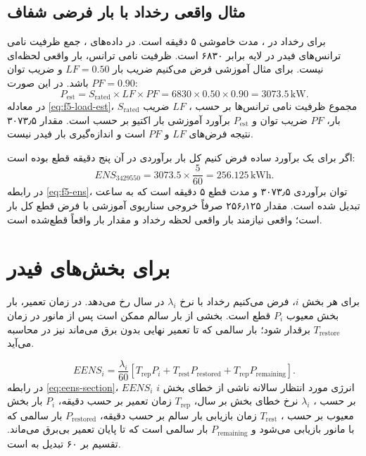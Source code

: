 \documentclass[11pt,a4paper,oneside]{book}
\newcommand{\file}[1]{\lr{\texttt{#1}}}
\newcommand{\code}[1]{\lr{\texttt{#1}}}
\newcommand{\unit}[1]{\,\mathrm{#1}}
\begin{document}
\subsection{مثال واقعی رخداد با بار فرضی شفاف}
برای رخداد  در \file{5.xlsx}، مدت خاموشی ۵ دقیقه است. در داده‌های ، جمع ظرفیت نامی ترانس‌های فیدر \code{F5} در لایه \code{ELWDTR} برابر ۶۸۳۰  است. ظرفیت نامی ترانس، بار واقعی لحظه‌ای نیست. برای مثال آموزشی فرض می‌کنیم ضریب بار $LF=0.50$ و ضریب توان $PF=0.90$ باشد. در این صورت:
\begin{equation}
 P_{\mathrm{est}}=S_{\mathrm{rated}}\times LF\times PF
 =6830\times0.50\times0.90=3073.5\unit{kW}.
 \label{eq:f5-load-est}
\end{equation}
در معادله \eqref{eq:f5-load-est}، $S_{\mathrm{rated}}$ مجموع ظرفیت نامی ترانس‌ها بر حسب ، $LF$ ضریب بار، $PF$ ضریب توان و $P_{\mathrm{est}}$ برآورد آموزشی بار اکتیو بر حسب  است. مقدار ۳۰۷۳٫۵  نتیجه فرض‌های $LF$ و $PF$ است و اندازه‌گیری بار فیدر نیست.

اگر برای یک برآورد ساده فرض کنیم کل بار برآوردی در آن پنج دقیقه قطع بوده است:
\begin{equation}
 ENS_{3429550}=3073.5\times\frac{5}{60}=256.125\unit{kWh}.
 \label{eq:f5-ens}
\end{equation}
در رابطه \eqref{eq:f5-ens}، توان برآوردی ۳۰۷۳٫۵  و مدت قطع ۵ دقیقه است که به ساعت تبدیل شده است. مقدار ۲۵۶٫۱۲۵  صرفاً خروجی سناریوی آموزشی با فرض قطع کل بار است؛  واقعی نیازمند بار واقعی لحظه رخداد و مقدار بار واقعاً قطع‌شده است.

\section{ برای بخش‌های فیدر}
برای هر بخش $i$، فرض می‌کنیم رخداد با نرخ $\lambda_i$ در سال رخ می‌دهد. در زمان تعمیر، بار بخش معیوب $P_i$ قطع است. بخشی از بار سالم ممکن است پس از مانور در زمان $T_{\mathrm{restore}}$ برقدار شود؛ بار سالمی که تا تعمیر نهایی بدون برق می‌ماند نیز در محاسبه می‌آید.

\begin{equation}
 EENS_i=\frac{\lambda_i}{60}\left[T_{\mathrm{rep}}P_i+T_{\mathrm{rest}}P_{\mathrm{restored}}+T_{\mathrm{rep}}P_{\mathrm{remaining}}\right].
 \label{eq:eens-section}
\end{equation}
در رابطه \eqref{eq:eens-section}، $EENS_i$ انرژی مورد انتظار سالانه ناشی از خطای بخش $i$ بر حسب ، $\lambda_i$ نرخ خطای بخش بر سال، $T_{\mathrm{rep}}$ زمان تعمیر بر حسب دقیقه، $P_i$ بار بخش معیوب بر حسب ، $T_{\mathrm{rest}}$ زمان بازیابی بار سالم بر حسب دقیقه، $P_{\mathrm{restored}}$ بار سالمی که با مانور بازیابی می‌شود و $P_{\mathrm{remaining}}$ بار سالمی است که تا پایان تعمیر بی‌برق می‌ماند. تقسیم بر ۶۰ تبدیل  به  است.
\end{document}
